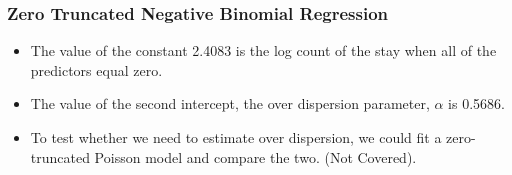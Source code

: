 \documentclass[MASTER.tex]{subfiles}
\begin{document}
\begin{frame}
		\frametitle{Zero Truncated Negative Binomial Regression}
\begin{itemize}
	\item		
The value of the constant 2.4083 is the log count of the stay when all of the predictors equal zero.
\item The value of the second intercept, the over dispersion parameter, $\alpha$ is 0.5686.
\item To test whether we need to estimate over dispersion, we could fit a zero-truncated Poisson model and compare the two. (Not Covered).
\end{itemize}
\end{frame}
\end{document}
